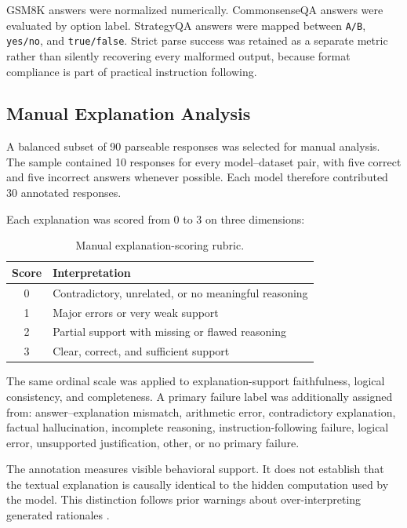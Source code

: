\documentclass{article}
\begin{document}
GSM8K answers were normalized numerically. CommonsenseQA answers were evaluated by option label. StrategyQA answers were mapped between \texttt{A/B}, \texttt{yes/no}, and \texttt{true/false}. Strict parse success was retained as a separate metric rather than silently recovering every malformed output, because format compliance is part of practical instruction following.

\subsection{Manual Explanation Analysis}

A balanced subset of 90 parseable responses was selected for manual analysis. The sample contained 10 responses for every model--dataset pair, with five correct and five incorrect answers whenever possible. Each model therefore contributed 30 annotated responses.

Each explanation was scored from 0 to 3 on three dimensions:

\begin{table}[h]
\centering
\caption{Manual explanation-scoring rubric.}
\label{tab:rubric}
\begin{tabular}{cl}
\toprule
\textbf{Score} & \textbf{Interpretation} \\
\midrule
0 & Contradictory, unrelated, or no meaningful reasoning \\
1 & Major errors or very weak support \\
2 & Partial support with missing or flawed reasoning \\
3 & Clear, correct, and sufficient support \\
\bottomrule
\end{tabular}
\end{table}

The same ordinal scale was applied to explanation-support faithfulness, logical consistency, and completeness. A primary failure label was additionally assigned from: answer--explanation mismatch, arithmetic error, contradictory explanation, factual hallucination, incomplete reasoning, instruction-following failure, logical error, unsupported justification, other, or no primary failure.

The annotation measures visible behavioral support. It does not establish that the textual explanation is causally identical to the hidden computation used by the model. This distinction follows prior warnings about over-interpreting generated rationales \cite{turpin2023language,lanham2023measuring}.
\end{document}
